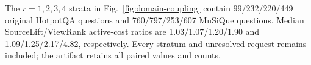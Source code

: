 The $r=1,2,3,4$ strata in Fig.~\ref{fig:domain-coupling} contain 99/232/220/449 original HotpotQA questions and 760/797/253/607 MuSiQue questions. Median SourceLift/ViewRank active-cost ratios are 1.03/1.07/1.20/1.90 and 1.09/1.25/2.17/4.82, respectively. Every stratum and unresolved request remains included; the artifact retains all paired values and counts.

